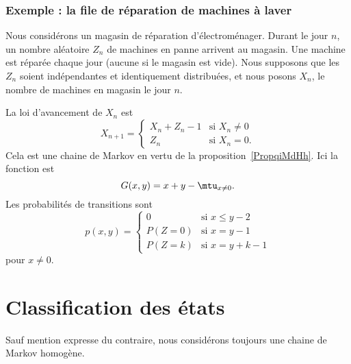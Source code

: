 \subsubsection{Exemple : la file de réparation de machines à laver}

Nous considérons un magasin de réparation d'électroménager. Durant le jour \( n\), un nombre aléatoire \( Z_{n}\) de machines en panne arrivent au magasin. Une machine est réparée chaque jour (aucune si le magasin est vide). Nous supposons que les \( Z_n\) soient indépendantes et identiquement distribuées, et nous posons \( X_n\), le nombre de machines en magasin le jour \( n\).

La loi d'avancement de \( X_n\) est
\begin{equation}
	X_{n+1}=\begin{cases}
		X_n+Z_n-1 & \text{si } X_n\neq 0 \\
		Z_n       & \text{si } X_n=0.
	\end{cases}
\end{equation}
Cela est une chaine de Markov en vertu de la proposition~\ref{PropqiMdHh}. Ici la fonction est
\begin{equation}
	G(x,y)=x+y-\mtu_{x\neq 0}.
\end{equation}
Les probabilités de transitions sont
\begin{equation}
	p(x,y)=\begin{cases}
		0      & \text{si } x\leq y-2 \\
		P(Z=0) & \text{si } x=y-1     \\
		P(Z=k) & \text{si } x=y+k-1
	\end{cases}
\end{equation}
pour \( x\neq 0\).


\section{Classification des états}

Sauf mention expresse du contraire, nous considérons toujours une chaine de Markov homogène.

